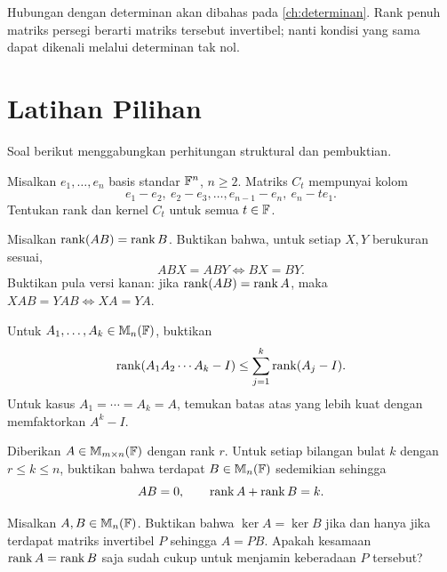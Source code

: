 Hubungan dengan determinan akan dibahas pada \autoref{ch:determinan}.
Rank penuh matriks persegi berarti matriks tersebut invertibel;
nanti kondisi yang sama dapat dikenali melalui determinan tak nol.

\section{Latihan Pilihan}
\label{rank:latihan}

Soal berikut menggabungkan perhitungan struktural dan pembuktian.

\begin{latihan}\label{rank:lat-siklus}
    Misalkan $e_1,\ldots,e_n$ basis standar $\mathbb{F}^n$, $n\ge2$.
    Matriks $C_t$ mempunyai kolom
    \[
        e_1-e_2,\ e_2-e_3,\ldots,e_{n-1}-e_n,\ e_n-te_1.
    \]
    Tentukan rank dan kernel $C_t$ untuk semua $t\in\mathbb{F}$.
\end{latihan}

\begin{latihan}\label{rank:lat-cancel}
    Misalkan $\operatorname{rank}(AB)=\operatorname{rank} B$. Buktikan bahwa, untuk setiap
    $X,Y$ berukuran sesuai,
    \[
        ABX=ABY\iff BX=BY.
    \]
    Buktikan pula versi kanan: jika $\operatorname{rank}(AB)=\operatorname{rank} A$, maka
    $XAB=YAB\iff XA=YA$.
\end{latihan}

\begin{latihan}\label{rank:lat-produk-identitas}
    Untuk $A_1,\ldots,A_k\in\mathbb{M}_n(\mathbb{F})$, buktikan
    \[
        \operatorname{rank}(A_1A_2\cdots A_k-I)
        \le\sum_{j=1}^k\operatorname{rank}(A_j-I).
    \]
    Untuk kasus $A_1=\cdots=A_k=A$, temukan batas atas yang lebih
    kuat dengan memfaktorkan $A^k-I$.
\end{latihan}

\begin{latihan}\label{rank:lat-konstruksi}
    Diberikan $A\in\mathbb{M}_{m\times n}(\mathbb{F})$ dengan rank $r$.
    Untuk setiap bilangan bulat $k$ dengan $r\le k\le n$, buktikan
    bahwa terdapat $B\in\mathbb{M}_n(\mathbb{F})$ sedemikian sehingga
    \[
        AB=0,\qquad \operatorname{rank} A+\operatorname{rank} B=k.
    \]
\end{latihan}

\begin{latihan}\label{rank:lat-kernel-sama}
    Misalkan $A,B\in\mathbb{M}_n(\mathbb{F})$. Buktikan bahwa $\ker A=\ker B$
    jika dan hanya jika terdapat matriks invertibel $P$ sehingga $A=PB$.
    Apakah kesamaan $\operatorname{rank} A=\operatorname{rank} B$ saja sudah cukup untuk
    menjamin keberadaan $P$ tersebut?
\end{latihan}

